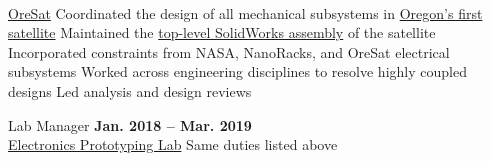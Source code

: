 \begin{innerlist}
    \\ \href{https://www.oresat.org/}{OreSat}
		\subitem Coordinated the design of all mechanical subsystems in \href{http://oresat.org/}{Oregon's first satellite}
		\subitem Maintained the \href{https://github.com/oresat/oresat-structure}{top-level SolidWorks assembly} of the satellite
		\subitem Incorporated constraints from NASA, NanoRacks, and OreSat electrical subsystems
		\subitem Worked across engineering disciplines to resolve highly coupled designs
		\subitem Led analysis and design reviews 
    \item Lab Manager \hfill\textbf{Jan. 2018 -- Mar. 2019}
    \\ \href{https://psu-epl.github.io/}{Electronics Prototyping Lab}
        \subitem Same duties listed above
	\end{innerlist}


